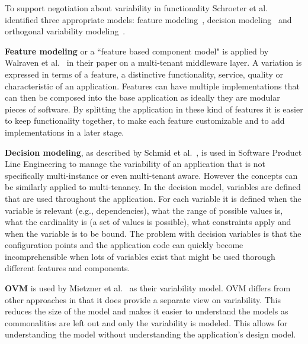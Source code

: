 To support negotiation about variability in functionality Schroeter et al.~\cite{schroeter2012towards} identified three appropriate models: feature modeling~\cite{benavides2010automated,kang1990feature}, decision modeling~\cite{schmid2004customizable,schmid2011comparison} and orthogonal variability modeling~\cite{lauenroth2005software,metzger2007disambiguating}.

\begin{compactitem}
\item \textbf{Feature modeling} or a ``feature based component model" is applied by Walraven et al.~\cite{walraven2011middleware} in their paper on a multi-tenant middleware layer. A variation is
expressed in terms of a feature, a distinctive functionality, service, quality or characteristic of an 
application. Features can have multiple implementations that can then be composed into the 
base application as ideally they are modular pieces of software. By splitting the application in 
these kind of features it is easier to keep functionality together, to make each feature 
customizable and to add implementations in a later stage.

\item \textbf{Decision modeling}, as described by Schmid et al.~\cite{schmid2004customizable}, is used in 
Software Product Line Engineering to manage the variability of an application that is not specifically 
multi-instance or even multi-tenant aware. However the concepts can be similarly applied to 
multi-tenancy. In the decision model, variables are defined that are used throughout the 
application. For each variable it is defined when the variable is relevant (e.g., dependencies), 
what the range of possible values is, what the cardinality is (a set of values is possible), what 
constraints apply and when the variable is to be bound. The problem with decision variables is 
that the configuration points and the application code can quickly become incomprehensible 
when lots of variables exist that might be used thorough different features and components.

\item \textbf{\acf{OVM}} is used by Mietzner et al.~\cite{mietzner2009variability} as their variability model. \ac{OVM} differs from other approaches in that it does provide a separate view on variability. This reduces the size of the model and makes it easier to understand the models as commonalities are left out and only the variability is modeled. This allows for understanding the model without understanding the application's design model. 


\end{compactitem}
